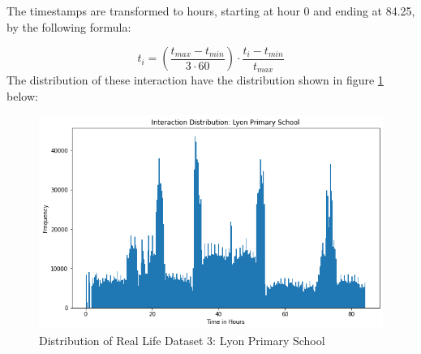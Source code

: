 The timestamps are transformed to hours, starting at hour 0 and ending at 84.25, by the following formula:

\begin{equation}
    t_i = \left(\frac{t_{max} - t_{min}}{3 \cdot 60} \right) \cdot \frac{t_i - t_{min}}{t_{max}}
\end{equation}
The distribution of these interaction have the distribution shown in figure \ref{fig:RLdataset3} below:

\begin{figure}[H]
    \centering
    \includegraphics[width=\textwidth]{0_images/real_dataset_3_dist.png}
    \caption{Distribution of Real Life Dataset 3: Lyon Primary School}
    \label{fig:RLdataset3}
\end{figure}







